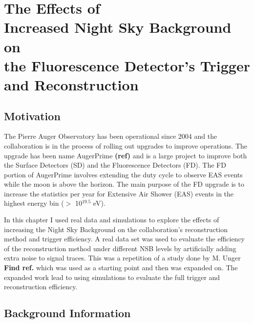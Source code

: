 \chapter[The Effects of Increased NSB on the FD Trigger and Reconstruction]{\centering The Effects of \\ Increased Night Sky Background on \\ the Fluorescence Detector's Trigger and Reconstruction \\ }\label{Ch:SelectEff}

\section{Motivation}

The Pierre Auger Observatory has been operational since 2004 and the collaboration  is in the process of rolling out upgrades to improve operations. The upgrade has been name AugerPrime \textbf{(ref)} and is a large project to improve both the Surface Detectors (SD) and the Fluorescence Detectors (FD). The FD portion of AugerPrime involves extending the duty cycle to observe EAS events while the moon is above the horizon. The main purpose of the FD upgrade is to increase the statistics per year for Extensive Air Shower (EAS) events in the highest energy bin ($>$ 10$^{19.5}$ eV). 

In this chapter I used real data and simulations to explore the effects of increasing the Night Sky Background on the collaboration's reconstruction method and trigger efficiency. A real data set was used to evaluate the efficiency of the reconstruction method under different NSB levels by artificially adding extra noise to signal traces. This was a repetition of a study done by M. Unger \textbf{Find ref.} which was used as a starting point and then was expanded on. The expanded work lead to using simulations to evaluate the full trigger and reconstruction efficiency.

\section{Background Information}

